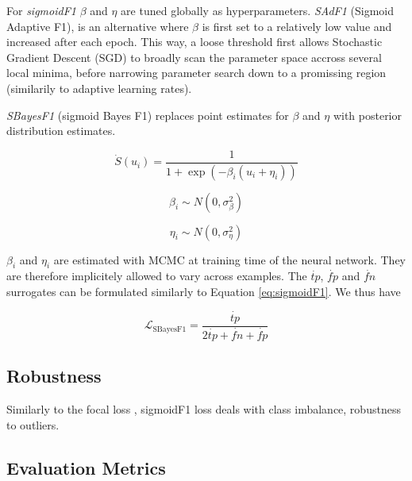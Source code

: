 For \emph{sigmoidF1} \(\beta\) and \(\eta\) are tuned globally as hyperparameters. \emph{SAdF1} (Sigmoid Adaptive F1), is an alternative where \(\beta\) is first set to a relatively low value and increased after each epoch. This way, a loose threshold first allows Stochastic Gradient Descent (SGD) to broadly scan the parameter space accross several local minima, before narrowing parameter search down to a promissing region (similarily to adaptive learning rates).

\emph{SBayesF1} (sigmoid Bayes F1) replaces point estimates for \(\beta\) and \(\eta\) with posterior distribution estimates. 

\begin{equation}
\dot{S}(u_i) = \frac{1}{1+\exp (-\beta_i (u_i + \eta_i))}
\end{equation}

$$ \beta_i \sim N(0, \sigma^{2}_{\beta}) $$

$$ \eta_i \sim N(0, \sigma^{2}_{\eta}) $$

\(\beta_i\) and \(\eta_i\) are estimated with MCMC at training time of the neural network. They are therefore implicitely allowed to vary across examples. The \(\dot{tp}\), \(\dot{fp}\) and \(\dot{fn}\) surrogates can be formulated similarly to Equation \ref{eq:sigmoidF1}. We thus have

\begin{equation}
\mathcal{L}_{\text {SBayesF1}}= \frac{\dot{tp}}{2 \dot{tp}+ \dot{fn}+ \dot{fp}}
\end{equation}





\subsection{Robustness}
\label{sec:org6c7c3d0}


Similarly to the focal loss \cite{focalLoss}, sigmoidF1 loss deals with class imbalance, robustness to outliers.




\subsection{Evaluation Metrics}
\label{sec:org23c8447}

